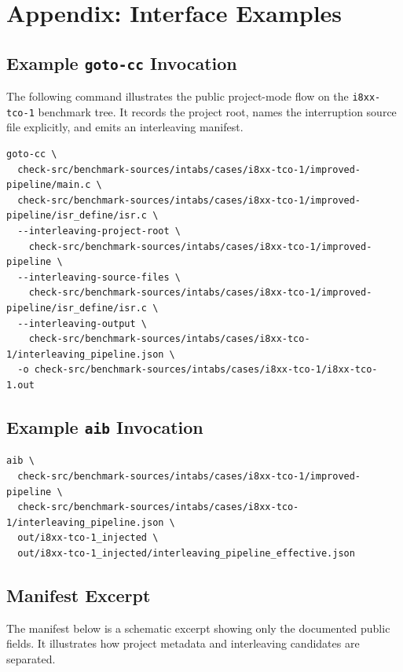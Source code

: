 \section{Appendix: Interface Examples}
\label{sec:appendix}

\subsection{Example \texttt{goto-cc} Invocation}

The following command illustrates the public project-mode flow on the
\texttt{i8xx-tco-1} benchmark tree. It records the project root, names the interruption
source file explicitly, and emits an interleaving manifest.

\begin{lstlisting}[caption={Example project-mode interleaving analysis command.}]
goto-cc \
  check-src/benchmark-sources/intabs/cases/i8xx-tco-1/improved-pipeline/main.c \
  check-src/benchmark-sources/intabs/cases/i8xx-tco-1/improved-pipeline/isr_define/isr.c \
  --interleaving-project-root \
    check-src/benchmark-sources/intabs/cases/i8xx-tco-1/improved-pipeline \
  --interleaving-source-files \
    check-src/benchmark-sources/intabs/cases/i8xx-tco-1/improved-pipeline/isr_define/isr.c \
  --interleaving-output \
    check-src/benchmark-sources/intabs/cases/i8xx-tco-1/interleaving_pipeline.json \
  -o check-src/benchmark-sources/intabs/cases/i8xx-tco-1/i8xx-tco-1.out
\end{lstlisting}

\subsection{Example \texttt{aib} Invocation}

\begin{lstlisting}[caption={Example AIB rewrite command.}]
aib \
  check-src/benchmark-sources/intabs/cases/i8xx-tco-1/improved-pipeline \
  check-src/benchmark-sources/intabs/cases/i8xx-tco-1/interleaving_pipeline.json \
  out/i8xx-tco-1_injected \
  out/i8xx-tco-1_injected/interleaving_pipeline_effective.json
\end{lstlisting}

\subsection{Manifest Excerpt}

The manifest below is a schematic excerpt showing only the documented public fields. It
illustrates how project metadata and interleaving candidates are separated.

